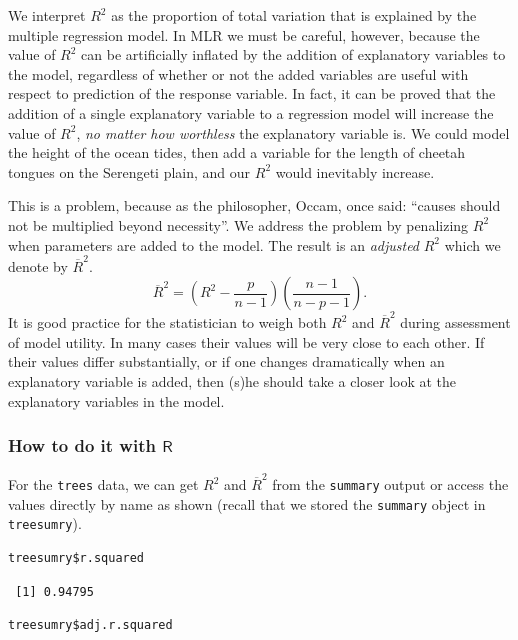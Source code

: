 \documentclass[captions=tableheading]{scrbook}
\begin{document}
We interpret \(R^{2}\) as the proportion of total variation that is explained by the multiple regression model. In MLR we must be careful, however, because the value of \(R^{2}\) can be artificially inflated by the addition of explanatory variables to the model, regardless of whether or not the added variables are useful with respect to prediction of the response variable. In fact, it can be proved that the addition of a single explanatory variable to a regression model will increase the value of \(R^{2}\), \emph{no matter how worthless} the explanatory variable is. We could model the height of the ocean tides, then add a variable for the length of cheetah tongues on the Serengeti plain, and our \(R^{2}\) would inevitably increase. 

This is a problem, because as the philosopher, Occam, once said: ``causes should not be multiplied beyond necessity''. We address the problem by penalizing \(R^{2}\) when parameters are added to the model. The result is an \emph{adjusted} \(R^{2}\) which we denote by \(\overline{R}^{2}\).
\begin{equation}
\overline{R}^{2}=\left(R^{2}-\frac{p}{n-1}\right)\left(\frac{n-1}{n-p-1}\right).
\end{equation}
It is good practice for the statistician to weigh both \(R^{2}\) and \(\overline{R}^{2}\) during assessment of model utility. In many cases their values will be very close to each other. If their values differ substantially, or if one changes dramatically when an explanatory variable is added, then (s)he should take a closer look at the explanatory variables in the model.
\subsubsection{How to do it with \(\mathsf{R}\)}
\label{sec-12-3-1-1}

For the \texttt{trees} data, we can get \(R^{2}\) and \(\overline{R}^{2}\) from the \texttt{summary} output or access the values directly by name as shown (recall that we stored the \texttt{summary} object in \texttt{treesumry}).


\begin{verbatim}
treesumry$r.squared
\end{verbatim}

\begin{verbatim}
 [1] 0.94795
\end{verbatim}


\begin{verbatim}
treesumry$adj.r.squared
\end{verbatim}
\end{document}
